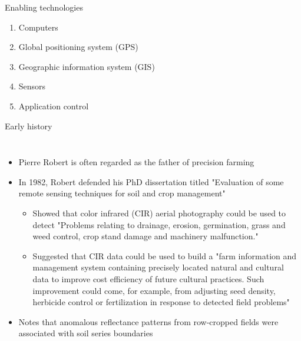 \documentclass[11pt,dvipsnames,ignorenonframetext,aspectratio=169]{beamer}
\providecommand{\tightlist}{%
  \setlength{\itemsep}{0pt}\setlength{\parskip}{0pt}}
\begin{document}
\begin{frame}{Enabling technologies}
\protect\hypertarget{enabling-technologies}{}
\begin{enumerate}
\tightlist
\item
  Computers
\item
  Global positioning system (GPS)
\item
  Geographic information system (GIS)
\item
  Sensors
\item
  Application control
\end{enumerate}
\end{frame}

\begin{frame}{Early history}
\protect\hypertarget{early-history}{}
\begin{columns}[T, onlytextwidth]


\begin{itemize}
\small
\item Pierre Robert is often regarded as the father of precision farming
\item In 1982, Robert defended his PhD dissertation titled "Evaluation of some remote sensing techniques for soil and crop management"
  \begin{itemize}
  \footnotesize
  \item Showed that color infrared (CIR) aerial photography could be used to detect "Problems relating to drainage, erosion, germination, grass and weed control, crop stand damage and machinery malfunction."
  \item Suggested that CIR data could be used to build a "farm information and management system containing precisely located natural and cultural data to improve cost efficiency of future cultural practices. Such improvement could come, for example, from adjusting seed density, herbicide control or fertilization in response to detected field problems"
  \end{itemize}
\item Notes that anomalous reflectance patterns from row-cropped fields were associated with soil series boundaries
\end{itemize}



\end{columns}
\end{frame}
\end{document}
